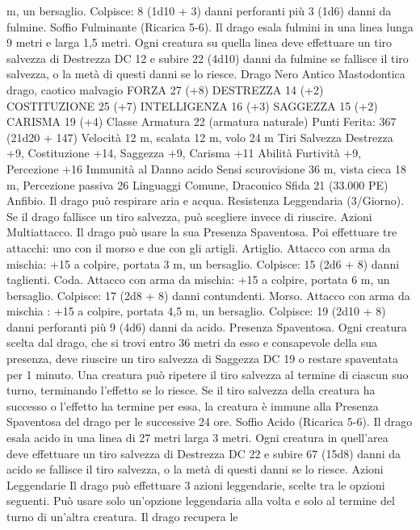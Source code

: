 \begin{multicols}{2}
m, un bersaglio.
Colpisce: 8 (1d10 + 3) danni perforanti più 3 (1d6) danni da
fulmine.
Soffio Fulminante (Ricarica 5-6). Il drago esala fulmini in una
linea lunga 9 metri e larga 1,5 metri. Ogni creatura su quella
linea deve effettuare un tiro salvezza di Destrezza DC 12 e subire
22 (4d10) danni da fulmine se fallisce il tiro salvezza, o la metà
di questi danni se lo riesce.
Drago Nero Antico
Mastodontica drago, caotico malvagio
FORZA 27 (+8)
DESTREZZA 14 (+2)
COSTITUZIONE 25 (+7)
INTELLIGENZA 16 (+3)
SAGGEZZA 15 (+2)
CARISMA 19 (+4)
Classe Armatura 22 (armatura naturale)
\hspace*{0pt}\hfill{Punti Ferita}: 367 (21d20 + 147)
Velocità 12 m, scalata 12 m, volo 24 m
Tiri Salvezza Destrezza +9, Costituzione +14, Saggezza +9,
Carisma +11
Abilità Furtività +9, Percezione +16
Immunità al Danno acido
Sensi scurovisione 36 m, vista cieca 18 m, Percezione passiva 26
Linguaggi Comune, Draconico
Sfida 21 (33.000 PE)
Anfibio. Il drago può respirare aria e acqua.
Resistenza Leggendaria (3/Giorno). Se il drago fallisce un tiro
salvezza, può scegliere invece di riuscire.
Azioni
Multiattacco. Il drago può usare la sua Presenza Spaventosa. Poi
effettuare tre attacchi: uno con il morso e due con gli artigli.
Artiglio. Attacco con arma da mischia: +15 a colpire, portata 3
m, un bersaglio.
Colpisce: 15 (2d6 + 8) danni taglienti.
Coda. Attacco con arma da mischia: +15 a colpire, portata 6 m,
un bersaglio.
Colpisce: 17 (2d8 + 8) danni contundenti.
Morso. Attacco con arma da mischia : +15 a colpire, portata 4,5
m, un bersaglio.
Colpisce: 19 (2d10 + 8) danni perforanti più 9 (4d6) danni da
acido.
Presenza Spaventosa. Ogni creatura scelta dal drago, che si trovi
entro 36 metri da esso e consapevole della sua presenza, deve
riuscire un tiro salvezza di Saggezza DC 19 o restare spaventata
per 1 minuto. Una creatura può ripetere il tiro salvezza al termine
di ciascun suo turno, terminando l’effetto se lo riesce. Se il tiro
salvezza della creatura ha successo o l’effetto ha termine per
essa, la creatura è immune alla Presenza Spaventosa del drago
per le successive 24 ore.
Soffio Acido (Ricarica 5-6). Il drago esala acido in una linea di
27 metri larga 3 metri. Ogni creatura in quell’area deve effettuare
un tiro salvezza di Destrezza DC 22 e subire 67 (15d8) danni da
acido se fallisce il tiro salvezza, o la metà di questi danni se lo
riesce.
Azioni Leggendarie
Il drago può effettuare 3 azioni leggendarie, scelte tra le opzioni
seguenti. Può usare solo un’opzione leggendaria alla volta e solo
al termine del turno di un’altra creatura. Il drago recupera le

\end{multicols}
